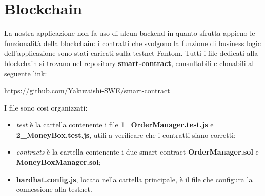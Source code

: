 \section{Blockchain}\label{section:blockchain}

La nostra applicazione non fa uso di alcun backend in quanto sfrutta appieno le funzionalità della blockchain: 
i contratti che svolgono la funzione di business logic dell'applicazione sono stati caricati sulla testnet\glo{} Fantom.
Tutti i file dedicati alla blockchain si trovano nel repository \textbf{smart-contract}, consultabili e clonabili al seguente link:

\begin{center}
    \href{https://github.com/Yakuzaishi-SWE/smart-contract}{https://github.com/Yakuzaishi-SWE/smart-contract}
\end{center}

I file sono cosi organizzati:
\begin{itemize}
    \item \textit{test} è la cartella contenente i file \textbf{1\_OrderManager.test.js} e \textbf{2\_MoneyBox.test.js}, utili a verificare che i contratti siano corretti;
    \item \textit{contracts} è la cartella contenente i due smart contract \textbf{OrderManager.sol} e \textbf{MoneyBoxManager.sol};
    \item \textbf{hardhat.config.js}, locato nella cartella principale, è il file che configura la connessione alla testnet.
\end{itemize}

